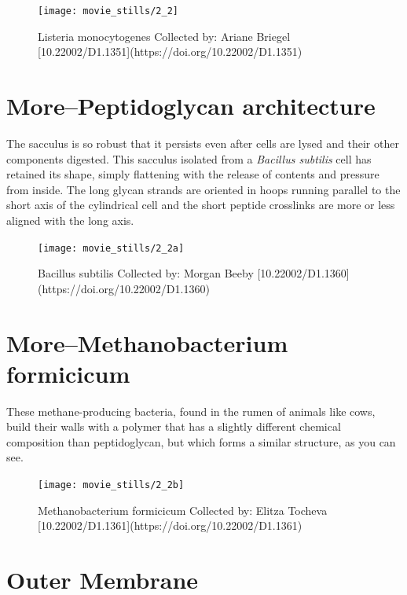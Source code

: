 \documentclass[]{tufte-book}
\begin{document}
\begin{figure}
\texttt{[image: movie\_stills/2\_2]} \caption[Listeria monocytogenes Collected by]{Listeria monocytogenes Collected by: Ariane Briegel [10.22002/D1.1351](https://doi.org/10.22002/D1.1351)}\label{fig:unnamed-chunk-20}
\end{figure}

\hypertarget{morepeptidoglycan-architecture}{\section{More--Peptidoglycan
architecture}\label{morepeptidoglycan-architecture}}

The sacculus is so robust that it persists even after cells are lysed
and their other components digested. This sacculus isolated from a
\emph{Bacillus subtilis} cell has retained its shape, simply flattening
with the release of contents and pressure from inside. The long glycan
strands are oriented in hoops running parallel to the short axis of the
cylindrical cell and the short peptide crosslinks are more or less
aligned with the long axis.

\begin{figure}
\texttt{[image: movie\_stills/2\_2a]} \caption[Bacillus subtilis Collected by]{Bacillus subtilis Collected by: Morgan Beeby [10.22002/D1.1360](https://doi.org/10.22002/D1.1360)}\label{fig:unnamed-chunk-21}
\end{figure}

\hypertarget{moremethanobacterium-formicicum}{\section{More--Methanobacterium
formicicum}\label{moremethanobacterium-formicicum}}

These methane-producing bacteria, found in the rumen of animals like
cows, build their walls with a polymer that has a slightly different
chemical composition than peptidoglycan, but which forms a similar
structure, as you can see.

\begin{figure}
\texttt{[image: movie\_stills/2\_2b]} \caption[Methanobacterium formicicum Collected by]{Methanobacterium formicicum Collected by: Elitza Tocheva [10.22002/D1.1361](https://doi.org/10.22002/D1.1361)}\label{fig:unnamed-chunk-22}
\end{figure}

\section{Outer Membrane}\label{outer-membrane}
\end{document}
